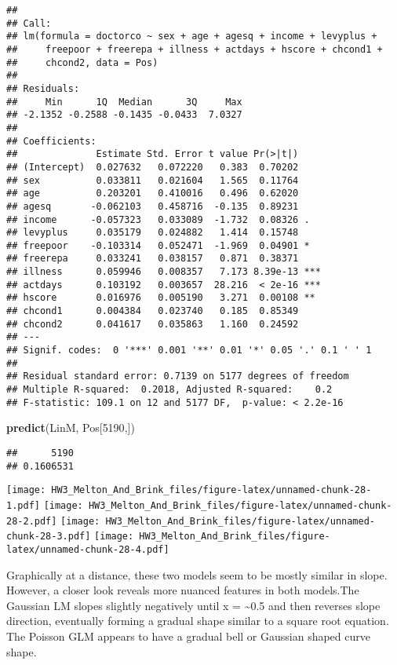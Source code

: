 \documentclass[
]{article}
\newenvironment{Shaded}{\begin{snugshade}}{\end{snugshade}}
\newcommand{\DecValTok}[1]{\textcolor[rgb]{0.00,0.00,0.81}{#1}}
\newcommand{\KeywordTok}[1]{\textcolor[rgb]{0.13,0.29,0.53}{\textbf{#1}}}
\newcommand{\NormalTok}[1]{#1}
\begin{document}
\begin{verbatim}
## 
## Call:
## lm(formula = doctorco ~ sex + age + agesq + income + levyplus + 
##     freepoor + freerepa + illness + actdays + hscore + chcond1 + 
##     chcond2, data = Pos)
## 
## Residuals:
##     Min      1Q  Median      3Q     Max 
## -2.1352 -0.2588 -0.1435 -0.0433  7.0327 
## 
## Coefficients:
##              Estimate Std. Error t value Pr(>|t|)    
## (Intercept)  0.027632   0.072220   0.383  0.70202    
## sex          0.033811   0.021604   1.565  0.11764    
## age          0.203201   0.410016   0.496  0.62020    
## agesq       -0.062103   0.458716  -0.135  0.89231    
## income      -0.057323   0.033089  -1.732  0.08326 .  
## levyplus     0.035179   0.024882   1.414  0.15748    
## freepoor    -0.103314   0.052471  -1.969  0.04901 *  
## freerepa     0.033241   0.038157   0.871  0.38371    
## illness      0.059946   0.008357   7.173 8.39e-13 ***
## actdays      0.103192   0.003657  28.216  < 2e-16 ***
## hscore       0.016976   0.005190   3.271  0.00108 ** 
## chcond1      0.004384   0.023740   0.185  0.85349    
## chcond2      0.041617   0.035863   1.160  0.24592    
## ---
## Signif. codes:  0 '***' 0.001 '**' 0.01 '*' 0.05 '.' 0.1 ' ' 1
## 
## Residual standard error: 0.7139 on 5177 degrees of freedom
## Multiple R-squared:  0.2018, Adjusted R-squared:    0.2 
## F-statistic: 109.1 on 12 and 5177 DF,  p-value: < 2.2e-16
\end{verbatim}

\begin{Shaded}
\begin{Highlighting}[]
\KeywordTok{predict}\NormalTok{(LinM, Pos[}\DecValTok{5190}\NormalTok{,])}
\end{Highlighting}
\end{Shaded}

\begin{verbatim}
##      5190 
## 0.1606531
\end{verbatim}

\texttt{[image: HW3\_Melton\_And\_Brink\_files/figure-latex/unnamed-chunk-28-1.pdf]}
\texttt{[image: HW3\_Melton\_And\_Brink\_files/figure-latex/unnamed-chunk-28-2.pdf]}
\texttt{[image: HW3\_Melton\_And\_Brink\_files/figure-latex/unnamed-chunk-28-3.pdf]}
\texttt{[image: HW3\_Melton\_And\_Brink\_files/figure-latex/unnamed-chunk-28-4.pdf]}

Graphically at a distance, these two models seem to be mostly similar in
slope. However, a closer look reveals more nuanced features in both
models.The Gaussian LM slopes slightly negatively until x =
\textasciitilde0.5 and then reverses slope direction, eventually forming
a gradual shape similar to a square root equation. The Poisson GLM
appears to have a gradual bell or Gaussian shaped curve shape.
\end{document}
